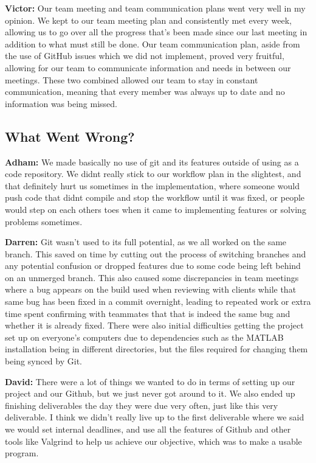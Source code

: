 \documentclass{article}
\begin{document}
\textbf{Victor:} Our team meeting and team communication plans went very well in my opinion. We kept to our team meeting plan and consistently met every week, 
allowing us to go over all the progress that's been made since our last meeting in addition to what must still be done. Our team communication plan, aside from the use of 
GitHub issues which we did not implement, proved very fruitful, allowing for our team to communicate information and needs in between our meetings. These two combined allowed 
our team to stay in constant communication, meaning that every member was always up to date and no information was being missed.

\subsection{What Went Wrong?}

\textbf{Adham:} We made basically no use of git and its features outside of using as a code repository. We didnt really stick to our workflow plan in the slightest, and that
definitely hurt us sometimes in the implementation, where someone would push code that didnt compile and stop the workflow until it was fixed, or people would step on each others
toes when it came to implementing features or solving problems sometimes.

\textbf{Darren:} Git wasn't used to its full potential, as we all worked on the same branch. This saved on time by cutting out the process of switching branches and any 
potential confusion or dropped features due to some code being left behind on an unmerged branch. This also caused some discrepancies in team meetings where a bug appears
on the build used when reviewing with clients while that same bug has been fixed in a commit overnight, leading to repeated work or extra time spent confirming with teammates
that that is indeed the same bug and whether it is already fixed. There were also initial difficulties getting the project set up on everyone's computers due to dependencies 
such as the MATLAB installation being in different directories, but the files required for changing them being synced by Git.

\textbf{David:} There were a lot of things we wanted to do in terms of setting up our project and our Github, but we 
just never got around to it. We also ended up finishing deliverables the day they were due very often, just like this 
very deliverable. I think we didn't really live up to the first deliverable where we said we would set internal 
deadlines, and use all the features of Github and other tools like Valgrind to help us achieve our objective, which was 
to make a usable program. 
\end{document}
